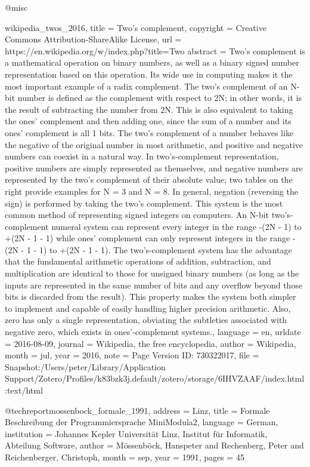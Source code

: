 {@misc{wikipedia_twos_2016,
  title     = {Two's complement},
  copyright = {Creative Commons Attribution-ShareAlike License},
  url       = {https://en.wikipedia.org/w/index.php?title=Two%
  abstract  = {Two's complement is a mathematical operation on binary numbers, as well as a binary signed number representation based on this operation. Its wide use in computing makes it the most important example of a radix complement.
The two's complement of an N-bit number is defined as the complement with respect to 2N; in other words, it is the result of subtracting the number from 2N. This is also equivalent to taking the ones' complement and then adding one, since the sum of a number and its ones' complement is all 1 bits. The two's complement of a number behaves like the negative of the original number in most arithmetic, and positive and negative numbers can coexist in a natural way.
In two's-complement representation, positive numbers are simply represented as themselves, and negative numbers are represented by the two's complement of their absolute value; two tables on the right provide examples for N = 3 and N = 8. In general, negation (reversing the sign) is performed by taking the two's complement. This system is the most common method of representing signed integers on computers. An N-bit two's-complement numeral system can represent every integer in the range -(2N - 1) to +(2N - 1 - 1) while ones' complement can only represent integers in the range -(2N - 1 - 1) to +(2N - 1 - 1).
The two's-complement system has the advantage that the fundamental arithmetic operations of addition, subtraction, and multiplication are identical to those for unsigned binary numbers (as long as the inputs are represented in the same number of bits and any overflow beyond those bits is discarded from the result). This property makes the system both simpler to implement and capable of easily handling higher precision arithmetic. Also, zero has only a single representation, obviating the subtleties associated with negative zero, which exists in ones'-complement systems.},
  language  = {en},
  urldate   = {2016-08-09},
  journal   = {Wikipedia, the free encyclopedia},
  author    = {{Wikipedia}},
  month     = jul,
  year      = {2016},
  note      = {Page Version ID: 730322017},
  file      = {Snapshot:/Users/peter/Library/Application Support/Zotero/Profiles/k83bzk3j.default/zotero/storage/6IHVZAAF/index.html:text/html}
}

@techreport{mossenbock_formale_1991,
  address     = {Linz},
  title       = {Formale {Beschreibung} der {Programmiersprache} {MiniModula}2},
  language    = {German},
  institution = {Johannes Kepler Universit{\"a}t Linz, Institut f{\"u}r Informatik, Abteilung Software},
  author      = {M{\"o}ssenb{\"o}ck, Hanspeter and Rechenberg, Peter and Reichenberger, Christoph},
  month       = sep,
  year        = {1991},
  pages       = {45}
}

}}
